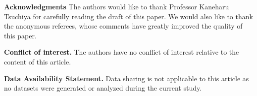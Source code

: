 \documentclass[12pt,a4paper]{article}
\newcommand{\1}{{\bf 1}}
\begin{document}
\noindent
{\bf Acknowledgments} 
The authors would like to thank Professor Kaneharu Tsuchiya for carefully reading the draft of this paper. We would also like to thank the anonymous referees, whose comments have greatly improved the quality of this paper. 

\bigskip
\noindent
{\bf Conflict of interest.} 
The authors have no conflict of interest relative to the content of this article.

\bigskip
\noindent
{\bf Data Availability Statement.} Data sharing is not applicable to this article as no datasets were generated or analyzed during the current study.

\providecommand{\bysame}{\leavevmode\hbox to3em{\hrulefill}\thinspace}
\end{document}
